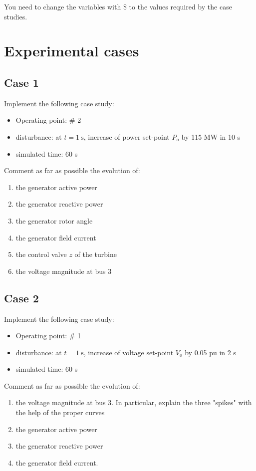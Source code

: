 \documentclass[a4paper,11pt,oneside,onecolumn]{article}
\begin{document}
\noindent You need to change the variables with \$ to the values required by the case studies.

\section{Experimental cases}

\subsection{Case 1}

Implement the following case study:
\begin{itemize}
\item  Operating point: \# 2
\item  disturbance: at $t=1 \mathrm{~s}$, increase of power set-point $P_o$ by 115 MW in 10 s
\item  simulated time: 60 s
\end{itemize}

\noindent Comment as far as possible the evolution of:
\begin{enumerate}
\item  the generator active power
\item   the generator reactive power
\item   the generator rotor angle
\item   the generator field current
\item   the control valve $z$ of the turbine
\item   the voltage magnitude at bus 3
\end{enumerate}

\subsection{Case 2}

Implement the following case study:
\begin{itemize}
\item  Operating point: \# 1
\item  disturbance: at $t=1 \mathrm{~s}$, increase of voltage set-point $V_o$ by 0.05 pu in 2 s
\item simulated time: 60 s
\end{itemize}

\noindent Comment as far as possible the evolution of:
\begin{enumerate}
\item the voltage magnitude at bus 3. In particular, explain the three "spikes" with the help of the proper curves
\item the generator active power
\item the generator reactive power
\item the generator field current.
\end{enumerate}
\end{document}

